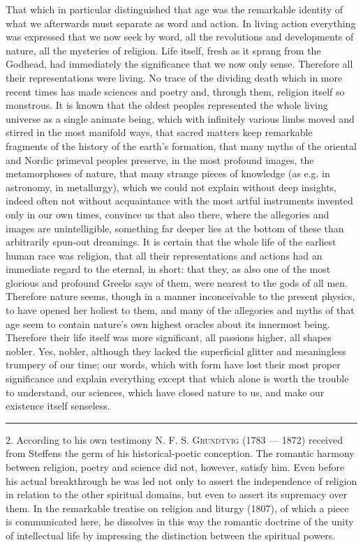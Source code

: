 \documentclass[12pt,a4paper,openany]{book}
\newcommand{\opage}[1]{\marginnote{\footnotesize\textit{[#1]}}}
\newenvironment{intro}{\par}{\par}
\newcommand{\sectionrule}{\par\begin{center}\rule{4em}{0.4pt}\end{center}}
\begin{document}
That which in particular distinguished that age was the remarkable identity
of what we afterwards must separate as word and action. In living action everything
was expressed that we now seek by word, all the revolutions and developments of
nature, all the mysteries of religion. Life itself, fresh as it sprang from the
Godhead, had immediately the significance that we now only sense. Therefore all
their representations were living. No trace of the dividing death which in more
recent times has made sciences and poetry and, through them, religion itself so
monstrous. It is known that the oldest peoples represented the whole living universe
as a single animate being, which with infinitely various limbs moved and stirred in
the most manifold ways, that sacred matters keep remarkable fragments of the history
of the earth's formation, that many
\setcounter{footnote}{0}%
\opage{53}myths of the oriental and Nordic primeval peoples preserve, in the most profound
images, the metamorphoses of nature, that many strange pieces of knowledge (as e.g.
in astronomy, in metallurgy), which we could not explain without deep insights,
indeed often not without acquaintance with the most artful instruments invented only
in our own times, convince us that also there, where the allegories and images are
unintelligible, something far deeper lies at the bottom of these than arbitrarily
spun-out dreamings. It is certain that the whole life of the earliest human race was
religion, that all their representations and actions had an immediate regard to the
eternal, in short: that they, as also one of the most glorious and profound Greeks
says of them, were nearest to the gods of all men. Therefore nature seems, though in
a manner inconceivable to the present physics, to have opened her holiest to them,
and many of the allegories and myths of that age seem to contain nature's own
highest oracles about its innermost being. Therefore their life itself was more
significant, all passions higher, all shapes nobler. Yes, nobler, although they
lacked the superficial glitter and meaningless trumpery of our time; our words,
which with form have lost their most proper significance and explain everything
except that which alone is worth the trouble to understand, our sciences, which have
closed nature to us, and make our existence itself senseless.

\sectionrule

\begin{intro}

2. According to his own testimony \textsc{N. F. S. Grundtvig} (1783
--- 1872) received from Steffens the germ of his historical-poetic conception.
The romantic harmony between religion, poetry and science did not, however, satisfy
him. Even before his actual breakthrough he was led not only to assert the
independence of religion in relation to the other spiritual domains, but even to
assert its supremacy over them. In the remarkable treatise on religion and liturgy
(1807), of which a piece is communicated here, he dissolves in this way the romantic
doctrine of the unity of intellectual
\setcounter{footnote}{0}%
\opage{54}life by impressing the distinction between the spiritual powers.
\end{intro}
\end{document}
